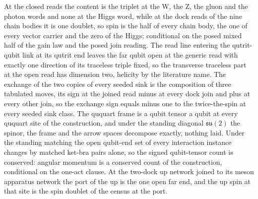 At the closed reads the content is the triplet at the W, the Z, the gluon and the photon words and none at the Higgs word, while at the dock reads of the nine chain bodies it is one doublet, so spin is the half of every chain body, the one of every vector carrier and the zero of the Higgs; conditional on the posed mixed half of the gain law and the posed join reading.
The read line entering the qutrit-qubit link at its qutrit end leaves the far qubit open at the generic read with exactly one direction of its traceless triple fixed, so the transverse traceless part at the open read has dimension two, helicity by the literature name.
The exchange of the two copies of every seeded sink is the composition of three tabulated moves, its sign at the joined read minus at every dock join and plus at every other join, so the exchange sign equals minus one to the twice-the-spin at every seeded sink class.
The ququart frame is a qubit tensor a qubit at every ququart site of the construction, and under the standing diagonal $\mathfrak{su}(2)$ the spinor, the frame and the arrow spaces decompose exactly, nothing laid.
Under the standing matching the open qubit-end set of every interaction instance changes by matched ket-bra pairs alone, so the signed qubit-tensor count is conserved: angular momentum is a conserved count of the construction, conditional on the one-act clause.
At the two-dock up network joined to its meson apparatus network the port of the up is the one open far end, and the up spin at that site is the spin doublet of the census at the port.
